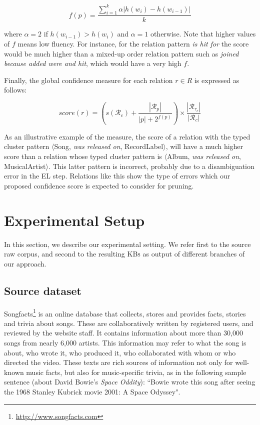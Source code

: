 \begin{equation}
f(p) = \frac{\sum_{i=1}^{k} \alpha | h(w_i) - h(w_{i-1}) |}{k}
\end{equation}

where $\alpha=2$ if $h(w_{i-1}) > h(w_i)$ and $\alpha=1$ otherwise. Note that higher values of $f$ means low fluency. For instance, for the relation pattern \textit{is hit for} the score would be much higher than a mixed-up order relation pattern such as \textit{joined because added were and hit}, which would have a very high $f$.  

Finally, the global confidence measure for each relation $r \in R$ is expressed as follows:

\begin{equation}
score(r) = \left({s(\mathcal{R}_c) + \frac{|\mathcal{R}_p|}{|p|+2^{f(p)}}}\right) \times {\frac{|\mathcal{R}_{\tau_c}|}{|\mathcal{R}_c|}}
\end{equation}

As an illustrative example of the measure, the score of a relation with the typed cluster pattern $\langle$Song, \textit{was released on}, RecordLabel$\rangle$, will have a much higher score than a relation whose typed cluster pattern is $\langle$Album, \textit{was released on}, MusicalArtist$\rangle$. This latter pattern is incorrect, probably due to a disambiguation error in the \textsc{EL} step. Relations like this show the type of errors which our proposed confidence score is expected to consider for pruning.



\section{Experimental Setup}\label{sec:exp}

In this section, we describe our experimental setting. We refer first to the source raw corpus, and second to the resulting \textsc{KBs} as output of different branches of our approach.


\subsection{Source dataset}\label{sec:exp:dataset}

Songfacts\footnote{\url{http://www.songfacts.com}} is an online database that collects, stores and provides facts, stories and trivia about songs. These are collaboratively written by registered users, and reviewed by the website staff. It contains information about more than 30,000 songs from nearly 6,000 artists. This information may refer to what the song is about, who wrote it, who produced it, who collaborated with whom or who directed the video. These texts are rich sources of information not only for well-known music facts, but also for music-specific trivia, as in the following sample sentence (about David Bowie's \textit{Space Oddity}): ``Bowie wrote this song after seeing the 1968 Stanley Kubrick movie 2001: A Space Odyssey".

